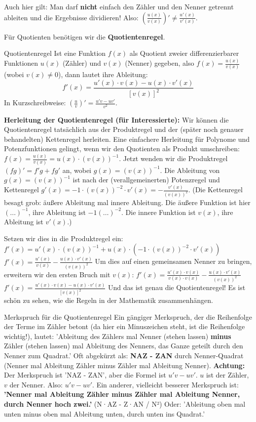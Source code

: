 Auch hier gilt: Man darf \textbf{nicht} einfach den Zähler und den Nenner getrennt ableiten und die Ergebnisse dividieren!
Also: $\left(\frac{u(x)}{v(x)}\right)' \neq \frac{u'(x)}{v'(x)}$.

Für Quotienten benötigen wir die \textbf{Quotientenregel}.

\begin{merksatzumgebung}{Quotientenregel}
Ist eine Funktion $f(x)$ als Quotient zweier differenzierbarer Funktionen $u(x)$ (Zähler) und $v(x)$ (Nenner) gegeben, also $f(x) = \frac{u(x)}{v(x)}$ (wobei $v(x) \neq 0$), dann lautet ihre Ableitung:
\[ f'(x) = \frac{u'(x) \cdot v(x) - u(x) \cdot v'(x)}{[v(x)]^2} \]
In Kurzschreibweise: $\left(\frac{u}{v}\right)' = \frac{u'v - uv'}{v^2}$.
\end{merksatzumgebung}

\textbf{Herleitung der Quotientenregel (für Interessierte):}
Wir können die Quotientenregel tatsächlich aus der Produktregel und der (später noch genauer behandelten) Kettenregel herleiten. Eine einfachere Herleitung für Polynome und Potenzfunktionen gelingt, wenn wir den Quotienten als Produkt umschreiben:
$f(x) = \frac{u(x)}{v(x)} = u(x) \cdot (v(x))^{-1}$.
Jetzt wenden wir die Produktregel $(fg)' = f'g + fg'$ an, wobei $g(x) = (v(x))^{-1}$.
Die Ableitung von $g(x)=(v(x))^{-1}$ ist nach der (verallgemeinerten) Potenzregel und Kettenregel $g'(x) = -1 \cdot (v(x))^{-2} \cdot v'(x) = -\frac{v'(x)}{(v(x))^2}$.
(Die Kettenregel besagt grob: äußere Ableitung mal innere Ableitung. Die äußere Funktion ist hier $(\dots)^{-1}$, ihre Ableitung ist $-1(\dots)^{-2}$. Die innere Funktion ist $v(x)$, ihre Ableitung ist $v'(x)$.)

Setzen wir dies in die Produktregel ein:
$f'(x) = u'(x) \cdot (v(x))^{-1} + u(x) \cdot \left( -1 \cdot (v(x))^{-2} \cdot v'(x) \right)$
$f'(x) = \frac{u'(x)}{v(x)} - \frac{u(x) \cdot v'(x)}{(v(x))^2}$
Um dies auf einen gemeinsamen Nenner zu bringen, erweitern wir den ersten Bruch mit $v(x)$:
$f'(x) = \frac{u'(x) \cdot v(x)}{v(x) \cdot v(x)} - \frac{u(x) \cdot v'(x)}{(v(x))^2}$
$f'(x) = \frac{u'(x) \cdot v(x) - u(x) \cdot v'(x)}{[v(x)]^2}$
Und das ist genau die Quotientenregel! Es ist schön zu sehen, wie die Regeln in der Mathematik zusammenhängen.

\begin{tippumgebung}{Merkspruch für die Quotientenregel}
Ein gängiger Merkspruch, der die Reihenfolge der Terme im Zähler betont (da hier ein Minuszeichen steht, ist die Reihenfolge wichtig!), lautet:
'Ableitung des Zählers mal Nenner (stehen lassen) \textbf{minus} Zähler (stehen lassen) mal Ableitung des Nenners, das Ganze geteilt durch den Nenner zum Quadrat.'
Oft abgekürzt als: \textbf{NAZ - ZAN} durch Nenner-Quadrat (Nenner mal Ableitung Zähler minus Zähler mal Ableitung Nenner).
\textbf{Achtung:} Der Merkspruch ist 'NAZ - ZAN', aber die Formel ist $u'v - uv'$. $u$ ist der Zähler, $v$ der Nenner. Also: $u'v - uv'$.
Ein anderer, vielleicht besserer Merkspruch ist: \textbf{'Nenner mal Ableitung Zähler minus Zähler mal Ableitung Nenner, durch Nenner hoch zwei.'} (N·AZ - Z·AN / N²)
Oder: 'Ableitung oben mal unten minus oben mal Ableitung unten, durch unten ins Quadrat.'
\end{tippumgebung}

